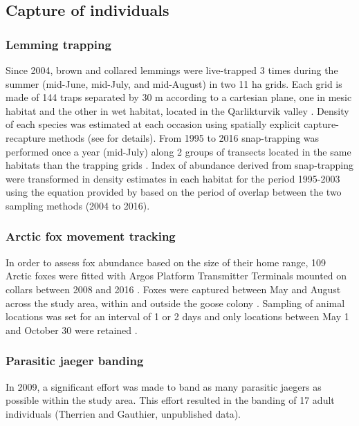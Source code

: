 \documentclass[a4paper,twoside,10pt]{article}
\begin{document}
\subsection{Capture of individuals}
\subsubsection{Lemming trapping}
Since 2004, brown and collared lemmings were live-trapped 3 times during the summer (mid-June, mid-July, and mid-August) in two 11 ha grids. Each grid is made of 144 traps separated by 30 m according to a cartesian plane, one in mesic habitat and the other in wet habitat, located in the Qarlikturvik valley \citep{fauteux2015, gauthier2020lemmings}. Density of each species was estimated at each occasion using spatially explicit capture-recapture methods (see \citet{fauteux2015} for details). From 1995 to 2016 snap-trapping was performed once a year (mid-July) along 2 groups of transects located in the same habitats than the trapping grids 
\citep{gruyer2008}. Index of abundance derived from snap-trapping were transformed in density estimates in each habitat for the period 1995-2003 using the equation provided by \citet{fauteux2018} based on the period of overlap between the two sampling methods (2004 to 2016). 

\subsubsection{Arctic fox movement tracking}
In order to assess fox abundance based on the size of their home range, 109 Arctic foxes were fitted with Argos Platform Transmitter Terminals mounted on collars between 2008 and 2016 \citep{lai2015,christin2015, dulude2023}. Foxes were captured between May and August across the study area, within and outside the goose colony \citep{dulude2023}. Sampling of animal locations was set for an interval of 1 or 2 days and only locations between May 1 and October 30 were retained \citep{dulude2023}. 

\subsubsection{Parasitic jaeger banding}
In 2009, a significant effort was made to band as many parasitic jaegers as possible within the study area. This effort resulted in the banding of 17 adult individuals (Therrien and Gauthier, unpublished data).
\newpage
\end{document}
